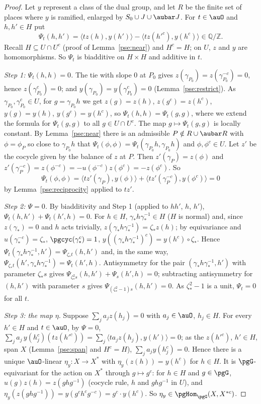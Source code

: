 \documentclass[10pt]{amsart}
\theoremstyle{definition}
\theoremstyle{remark}
\newcommand{\Z}{\mathbb Z}
\newcommand{\Q}{\mathbb Q}
\begin{document}
\begin{proof}
Let $y$ represent a class of the dual group, and let $R$ be the finite set of places where $y$ is
ramified, enlarged by $S_0\cup J\cup\aubar J$. For $t\in\auO$ and $h,h'\in H$ put
\[
\Psi_t(h,h')=\bigl\langle tz(h),y(h')\bigr\rangle-\bigl\langle tz(h'^c),y(h^c)\bigr\rangle\in\Q/\Z .
\]
Recall $H\subseteq U\cap U^c$ (proof of Lemma~\ref{pse:near}) and $H^c=H$; on $U$, $z$ and $y$ are
homomorphisms. So $\Psi_t$ is biadditive on $H\times H$ and additive in $t$.

\emph{Step 1: $\Psi_t(h,h)=0$.} The tie with slope $0$ at $P_0$ gives $z(\gamma_{P_0})=
z(\gamma_{P_0}^{-c})=0$, hence $z(\gamma_{P_0}^c)=0$; and $y(\gamma_{P_0})=y(\gamma_{P_0}^c)=0$
(Lemma~\ref{pse:restrict}). As $\gamma_{P_0},\gamma_{P_0}^c\in U$, for $g=\gamma_{P_0}h$ we get
$z(g)=z(h)$, $z(g^c)=z(h^c)$, $y(g)=y(h)$, $y(g^c)=y(h^c)$, so $\Psi_t(h,h)=\Psi_t(g,g)$, where we
extend the formula for $\Psi_t(g,g)$ to all $g\in U\cap U^c$. The map $g\mapsto\Psi_t(g,g)$ is
locally constant. By Lemma~\ref{pse:near} there is an admissible $P\notin R\cup\aubar R$ with
$\phi=\phi_P$ so close to $\gamma_{P_0}h$ that $\Psi_t(\phi,\phi)=\Psi_t(\gamma_{P_0}h,
\gamma_{P_0}h)$ and $\phi,\phi^c\in U$. Let $z'$ be the cocycle given by the balance of $z$ at $P$.
Then $z'(\gamma_P)=z(\phi)$ and $z'(\gamma_P^{-c})=z(\phi^{-c})=-u(\phi^{-c})z(\phi^c)=-z(\phi^c)$. So
\[
\Psi_t(\phi,\phi)=\bigl\langle tz'(\gamma_P),y(\phi)\bigr\rangle+\bigl\langle tz'(\gamma_P^{-c}),
y(\phi^c)\bigr\rangle=0
\]
by Lemma~\ref{pse:reciprocity} applied to $tz'$.

\emph{Step 2: $\Psi=0$.} By biadditivity and Step 1 (applied to $hh'$, $h$, $h'$),
$\Psi_t(h,h')+\Psi_t(h',h)=0$. For $h\in H$, $\gamma_*h\gamma_*^{-1}\in H$ ($H$ is normal) and, since
$z(\gamma_*)=0$ and $h$ acts trivially, $z(\gamma_*h\gamma_*^{-1})=\zeta_*z(h)$; by equivariance and
$u(\gamma_*^{-c})=\zeta_*$, $\pgcyc(\gamma_*^c)=1$, $y((\gamma_*h\gamma_*^{-1})^c)=y(h^c)\circ\zeta_*$.
Hence $\Psi_t(\gamma_*h\gamma_*^{-1},h')=\Psi_{\zeta_*t}(h,h')$ and, in the same way,
$\Psi_{\zeta_*t}(h',\gamma_*h\gamma_*^{-1})=\Psi_t(h',h)$. Antisymmetry for the pair
$(\gamma_*h\gamma_*^{-1},h')$ with parameter $\zeta_*s$ gives $\Psi_{\zeta_*^2s}(h,h')+\Psi_s(h',h)=0$;
subtracting antisymmetry for $(h,h')$ with parameter $s$ gives $\Psi_{(\zeta_*^2-1)s}(h,h')=0$. As
$\zeta_*^2-1$ is a unit, $\Psi_t=0$ for all $t$.

\emph{Step 3: the map $\eta$.} Suppose $\sum_ja_jz(h_j)=0$ with $a_j\in\auO$, $h_j\in H$. For every
$h'\in H$ and $t\in\auO$, by $\Psi=0$,
$\sum_ja_j\,y(h_j^c)(tz(h'^c))=\sum_j\langle ta_jz(h_j),y(h')\rangle=0$; as the $z(h'^c)$, $h'\in H$,
span $X$ (Lemma~\ref{pse:span} and $H^c=H$), $\sum_ja_jy(h_j^c)=0$. Hence there is a unique
$\auO$-linear $\eta_y\colon X\to X^*$ with $\eta_y(z(h))=y(h^c)$ for $h\in H$. It is
$\pgG$-equivariant for the action on $X^*$ through $g\mapsto g^c$: for $h\in H$ and $g\in\pgG$,
$u(g)z(h)=z(ghg^{-1})$ (cocycle rule, $h$ and $ghg^{-1}$ in $U$), and $\eta_y(z(ghg^{-1}))=
y(g^ch^cg^{-c})=g^c\cdot y(h^c)$. So $\eta_y\in\pgHom_{\pgG}(X,X^{*c})$.


\end{proof}
\end{document}
